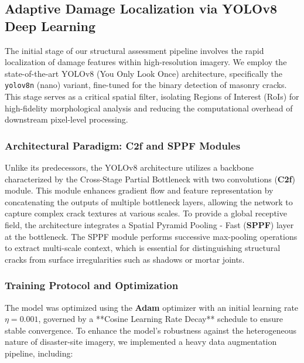 \subsection{Adaptive Damage Localization via YOLOv8 Deep Learning}
\label{sec:crack_localization}

\begin{sloppypar}
The initial stage of our structural assessment pipeline involves the rapid localization of damage features within high-resolution imagery. We employ the state-of-the-art YOLOv8 (You Only Look Once) architecture, specifically the \texttt{yolov8n} (nano) variant, fine-tuned for the binary detection of masonry cracks. This stage serves as a critical spatial filter, isolating Regions of Interest (RoIs) for high-fidelity morphological analysis and reducing the computational overhead of downstream pixel-level processing.
\end{sloppypar}

\subsubsection{Architectural Paradigm: C2f and SPPF Modules}
\begin{sloppypar}
Unlike its predecessors, the YOLOv8 architecture utilizes a backbone characterized by the Cross-Stage Partial Bottleneck with two convolutions (\textbf{C2f}) module. This module enhances gradient flow and feature representation by concatenating the outputs of multiple bottleneck layers, allowing the network to capture complex crack textures at various scales. To provide a global receptive field, the architecture integrates a Spatial Pyramid Pooling - Fast (\textbf{SPPF}) layer at the bottleneck. The SPPF module performs successive max-pooling operations to extract multi-scale context, which is essential for distinguishing structural cracks from surface irregularities such as shadows or mortar joints.
\end{sloppypar}

\subsubsection{Training Protocol and Optimization}
\begin{sloppypar}
The model was optimized using the \textbf{Adam} optimizer with an initial learning rate $\eta = 0.001$, governed by a **Cosine Learning Rate Decay** schedule to ensure stable convergence. To enhance the model's robustness against the heterogeneous nature of disaster-site imagery, we implemented a heavy data augmentation pipeline, including:
\end{sloppypar}

